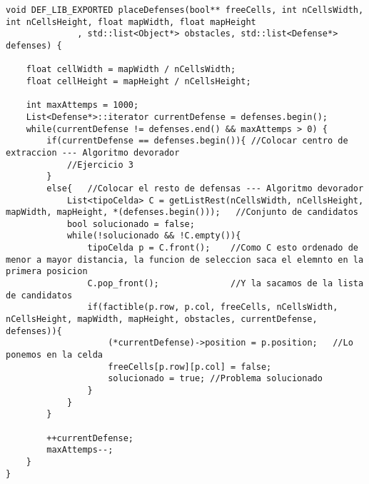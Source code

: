 \begin{lstlisting}
void DEF_LIB_EXPORTED placeDefenses(bool** freeCells, int nCellsWidth, int nCellsHeight, float mapWidth, float mapHeight
              , std::list<Object*> obstacles, std::list<Defense*> defenses) {

    float cellWidth = mapWidth / nCellsWidth;
    float cellHeight = mapHeight / nCellsHeight;

    int maxAttemps = 1000;
    List<Defense*>::iterator currentDefense = defenses.begin();
    while(currentDefense != defenses.end() && maxAttemps > 0) {
        if(currentDefense == defenses.begin()){ //Colocar centro de extraccion --- Algoritmo devorador
            //Ejercicio 3
        }
        else{   //Colocar el resto de defensas --- Algoritmo devorador
            List<tipoCelda> C = getListRest(nCellsWidth, nCellsHeight, mapWidth, mapHeight, *(defenses.begin()));   //Conjunto de candidatos
            bool solucionado = false;
            while(!solucionado && !C.empty()){
                tipoCelda p = C.front();    //Como C esto ordenado de menor a mayor distancia, la funcion de seleccion saca el elemnto en la primera posicion
                C.pop_front();              //Y la sacamos de la lista de candidatos
                if(factible(p.row, p.col, freeCells, nCellsWidth, nCellsHeight, mapWidth, mapHeight, obstacles, currentDefense, defenses)){
                    (*currentDefense)->position = p.position;   //Lo ponemos en la celda
                    freeCells[p.row][p.col] = false;
                    solucionado = true; //Problema solucionado
                }
            }
        }

        ++currentDefense;
        maxAttemps--;
    }
}
\end{lstlisting}

